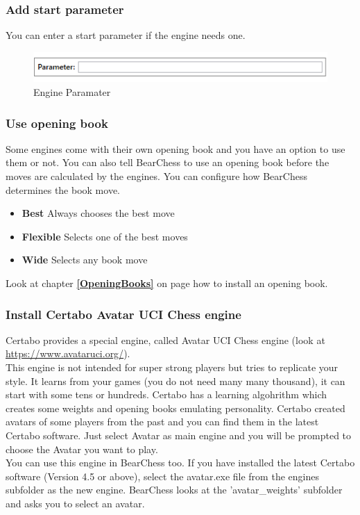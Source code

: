 \documentclass[11pt,a4paper]{article}
\begin{document}
\subsubsection{Add start parameter}
You can enter a start parameter if the engine needs one.
\begin{figure}[H]
	\centering
	\includegraphics[scale=0.9]{engineParameter.png}
	\caption{Engine Paramater}
	\label{fig:EngineParameter}
\end{figure}

\subsubsection{Use opening book}
Some engines come with their own opening book and you have an option to use them or not. You can also tell BearChess to use an opening book before the moves are calculated by the engines. You can configure how BearChess determines the book move. 
\begin{itemize}
	\item \textbf{Best} Always chooses the best move
	\item \textbf{Flexible} Selects one of the best moves
    \item \textbf{Wide} Selects any book move
\end{itemize}
Look at chapter \textbf{\ref{OpeningBooks}  } on page \pageref{OpeningBooks} how to install an opening book.

\subsubsection{Install Certabo Avatar UCI Chess engine}
Certabo provides a special engine, called Avatar UCI Chess engine (look at \url{https://www.avataruci.org/}).\\
This engine is not intended for super strong players but tries to replicate your style. It learns from your games (you do not need many many thousand), it can start with some tens or hundreds. Certabo has a learning algohrithm which creates some weights and opening books emulating personality. Certabo created avatars of some players from the past and you can find them in the latest Certabo software. Just select Avatar as main engine and you will be prompted to choose the Avatar you want to play.\\
You can use this engine in BearChess too. 
If you have installed the latest Certabo software (Version 4.5 or above), select the avatar.exe file from the engines subfolder as the new engine. BearChess looks at the 'avatar\_weights' subfolder and asks you to select an avatar.
\end{document}
